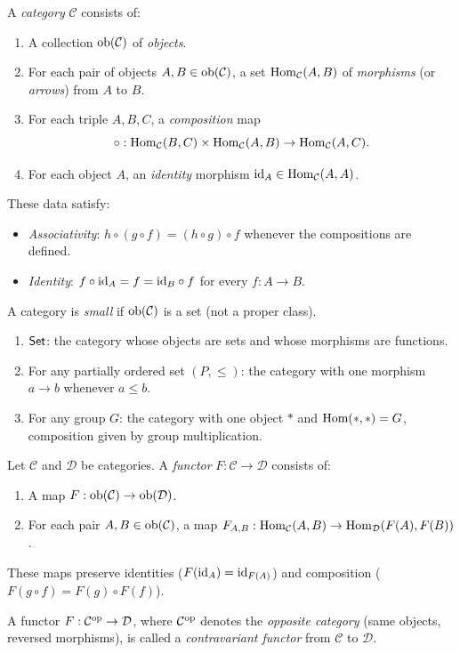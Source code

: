 \begin{definition}[Category]
\label{def:category}
A \emph{category} $\mathcal{C}$ consists of:
\begin{enumerate}[label=(\roman*)]
\item A collection $\mathrm{ob}(\mathcal{C})$ of \emph{objects}.
\item For each pair of objects $A, B \in \mathrm{ob}(\mathcal{C})$, a set
  $\mathrm{Hom}_{\mathcal{C}}(A, B)$ of \emph{morphisms} (or \emph{arrows})
  from $A$ to $B$.
\item For each triple $A, B, C$, a \emph{composition} map
  \[
    \circ : \mathrm{Hom}_{\mathcal{C}}(B, C) \times \mathrm{Hom}_{\mathcal{C}}(A, B)
    \to \mathrm{Hom}_{\mathcal{C}}(A, C).
  \]
\item For each object $A$, an \emph{identity} morphism
  $\mathrm{id}_A \in \mathrm{Hom}_{\mathcal{C}}(A, A)$.
\end{enumerate}
These data satisfy:
\begin{itemize}
\item \emph{Associativity}: $h \circ (g \circ f) = (h \circ g) \circ f$
  whenever the compositions are defined.
\item \emph{Identity}: $f \circ \mathrm{id}_A = f = \mathrm{id}_B \circ f$ for every
  $f : A \to B$.
\end{itemize}
A category is \emph{small} if $\mathrm{ob}(\mathcal{C})$ is a set (not a
proper class).
\end{definition}

\begin{example}
\label{ex:basic-categories}
\begin{enumerate}[label=(\alph*)]
\item $\mathsf{Set}$: the category whose objects are sets and whose morphisms are functions.
\item For any partially ordered set $(P, \leq)$: the category with one morphism $a \to b$ whenever $a \leq b$.
\item For any group $G$: the category with one object $\ast$ and $\mathrm{Hom}(\ast, \ast) = G$, composition given by group multiplication.
\end{enumerate}
\end{example}

\begin{definition}[Functor]
\label{def:functor}
Let $\mathcal{C}$ and $\mathcal{D}$ be categories.  A \emph{functor}
$F : \mathcal{C} \to \mathcal{D}$ consists of:
\begin{enumerate}[label=(\roman*)]
\item A map $F : \mathrm{ob}(\mathcal{C}) \to \mathrm{ob}(\mathcal{D})$.
\item For each pair $A, B \in \mathrm{ob}(\mathcal{C})$, a map
  $F_{A,B} : \mathrm{Hom}_{\mathcal{C}}(A, B) \to \mathrm{Hom}_{\mathcal{D}}(F(A), F(B))$.
\end{enumerate}
These maps preserve identities ($F(\mathrm{id}_A) = \mathrm{id}_{F(A)}$) and
composition ($F(g \circ f) = F(g) \circ F(f)$).

A functor $F : \mathcal{C}^{\mathrm{op}} \to \mathcal{D}$, where
$\mathcal{C}^{\mathrm{op}}$ denotes the \emph{opposite category} (same
objects, reversed morphisms), is called a \emph{contravariant functor}
from $\mathcal{C}$ to $\mathcal{D}$.
\end{definition}

